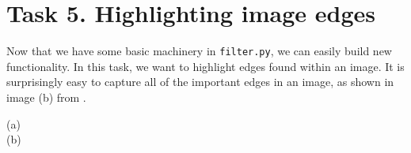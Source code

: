 \vspace{10mm}

\section{Task 5. Highlighting image edges}

Now that we have some basic machinery in {\tt filter.py}, we can easily build new functionality. In this task, we want to highlight edges found within an image.  It is surprisingly easy to capture all of the important edges in an image, as shown in image (b) from . 

\begin{marginfigure}
\vspace{20mm}
\begin{center}
(a) \\
(b) 

\end{center}
\end{marginfigure}
